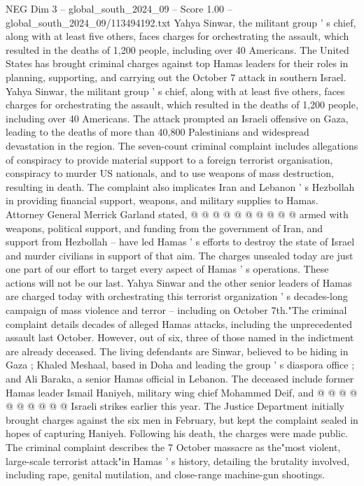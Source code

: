 \begin{textsample}{NEG Dim 3 – global\_south\_2024\_09 – Score 1.00 – global\_south\_2024\_09/113494192.txt}  \label{ex:f3_neg_140}
Yahya Sinwar, the militant group ' s chief, along with at least five others, faces charges for orchestrating the assault, which resulted in the deaths of 1,200 people, including over 40 Americans.
The United States has brought criminal charges against top Hamas leaders for their roles in planning, supporting, and carrying out the October 7 attack in southern Israel.
Yahya Sinwar, the militant group ' s chief, along with at least five others, faces charges for orchestrating the assault, which resulted in the deaths of 1,200 people, including over 40 Americans.
The attack prompted an Israeli offensive on Gaza, leading to the deaths of more than 40,800 Palestinians and widespread devastation in the region.
The seven-count criminal complaint includes allegations of conspiracy to provide material support to a foreign terrorist organisation, conspiracy to murder US nationals, and to use weapons of mass destruction, resulting in death.
The complaint also implicates Iran and Lebanon ' s Hezbollah in providing financial support, weapons, and military supplies to Hamas.
Attorney General Merrick Garland stated, @ @ @ @ @ @ @ @ @ @ armed with weapons, political support, and funding from the government of Iran, and support from Hezbollah -- have led Hamas ' s efforts to destroy the state of Israel and murder civilians in support of that aim.
The charges unsealed today are just one part of our effort to target every aspect of Hamas ' s operations.
These actions will not be our last.
Yahya Sinwar and the other senior leaders of Hamas are charged today with orchestrating this terrorist organization ' s decades-long campaign of mass violence and terror -- including on October 7th."The criminal complaint details decades of alleged Hamas attacks, including the unprecedented assault last October.
However, out of six, three of those named in the indictment are already deceased.
The living defendants are Sinwar, believed to be hiding in Gaza ; Khaled Meshaal, based in Doha and leading the group ' s diaspora office ; and Ali Baraka, a senior Hamas official in Lebanon.
The deceased include former Hamas leader Ismail Haniyeh, military wing chief Mohammed Deif, and @ @ @ @ @ @ @ @ @ @ Israeli strikes earlier this year.
The Justice Department initially brought charges against the six men in February, but kept the complaint sealed in hopes of capturing Haniyeh.
Following his death, the charges were made public.
The criminal complaint describes the 7 October massacre as the"most violent, large-scale terrorist attack"in Hamas ' s history, detailing the brutality involved, including rape, genital mutilation, and close-range machine-gun shootings.

\end{textsample}
